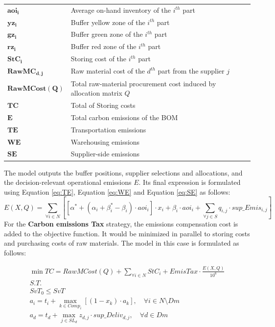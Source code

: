 \documentclass[preprint,12pt,authoryear]{elsarticle}
\begin{document}
\begin{longtable}{@{}p{}p{}@{}}
    $\bm{aoi_{i}}$ & Average on-hand inventory of the $i^{th}$ part\\
        $\bm{yz_{i}}$ & Buffer yellow zone of the $i^{th}$ part\\
    $\bm{gz_{i}}$ & Buffer green zone of the $i^{th}$ part\\
    $\bm{rz_{i}}$ & Buffer red zone of the $i^{th}$ part\\
    $\bm{StC_{i}}$ & Storing cost of the $i^{th}$ part\\
    $\bm{RawMC_{d,j}}$ & Raw material cost of the $d^{th}$ part from the supplier $j$\\
    $\bm{RawMCost(Q)}$ & Total raw-material procurement cost induced by allocation matrix $Q$\\
    $\bm{TC}$ & Total of Storing costs\\
    $\bm{E}$ & Total carbon emissions of the BOM\\
    $\bm{TE}$ & Transportation emissions\\
    $\bm{WE}$ & Warehousing emissions\\
    $\bm{SE}$ & Supplier-side emissions\\
\hline
 \end{longtable}
\endgroup
The model outputs the buffer positions, supplier selections and allocations, and the decision-relevant operational emissions $E$. Its final expression is formulated using Equation \ref{eq:TE}, Equation \ref{eq:WE} and Equation \ref{eq:SE} as follows:
\begin{equation}
     E(X,Q) = \sum_{\forall i\in N} [[\alpha^{*} + (\alpha_{i}+ \beta_{i}^{*}-\beta_{i})\cdot aoi_{i}]\cdot x_{i} + \beta_{i}\cdot aoi_{i} + \sum_{\forall j\in S} q_{i,j}\cdot sup\_Emis_{i,j}]\label{eq:emissions}
\end{equation}
For the \textbf{Carbon emissions Tax} strategy, the emissions compensation cost is added to the objective function. It would be minimized in parallel to storing costs and purchasing costs of raw materials. The model in this case is formulated as follows:

\begin{gather}
    \min TC = RawMCost(Q) + \sum_{\forall i\in N} StC_{i} + EmisTax \cdot \frac{E(X,Q)}{10^{6}}\\
    \nonumber S.T.\\
    \nonumber SvT_{0} \leq SvT\\
    \nonumber a_{i} = t_{i} + \max_{k\in Comp_{i}}[(1-x_{k})\cdot a_{k}],\quad \forall i \in N\setminus Dm \\
    \nonumber a_{d} = t_{d} + \max_{j\in SL_{d}} z_{d,j}\cdot sup\_Deliv_{d,j},\quad \forall d \in Dm
\end{gather}
\end{document}
